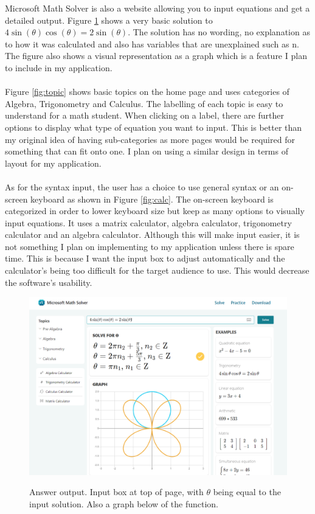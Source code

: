 \documentclass[final]{cmpreport}
\begin{document}
	Microsoft Math Solver \cite{math} is also a website allowing you to input equations and get a detailed output. Figure \ref{fig:output} shows a very basic solution to $ 4 \sin (   \theta     )   \cos (   \theta     )   =  2 \sin (   \theta     )   $. The solution has no wording, no explanation as to how it was calculated and also has variables that are unexplained such as n. The figure also shows a visual representation as a graph which is a feature I plan to include in my application.\\
	\\Figure \ref{fig:topic} shows basic topics on the home page and uses categories of Algebra, Trigonometry and Calculus. The labelling of each topic is easy to understand for a math student. When clicking on a label, there are further options to display what type of equation you want to input. This is better than my original idea of having sub-categories as more pages would be required for something that can fit onto one. I plan on using a similar design in terms of layout for my application.\\
	\\As for the syntax input, the user has a choice to use general syntax or an on-screen keyboard as shown in Figure \ref{fig:calc}. The on-screen keyboard is categorized in order to lower keyboard size but keep as many options to visually input equations. It uses a matrix calculator, algebra calculator, trigonometry calculator and an algebra calculator. Although this will make input easier, it is not something I plan on implementing to my application unless there is spare time. This is because I want the input box to adjust automatically and the calculator's being too difficult for the target audience to use. This would decrease the software's usability.\\
	\begin{figure}[h!]
		\caption{Answer output. Input box at top of page, with $\theta$ being equal to the input solution. Also a graph below of the function. }
		\centering
		\includegraphics[scale=0.4]{mathsolver3.png}
		\label{fig:output}
	\end{figure}
\end{document}
